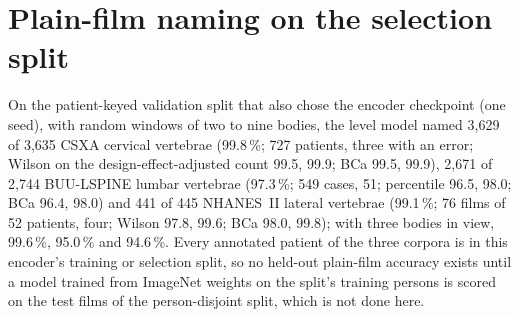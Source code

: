 \section*{Plain-film naming on the selection split}
On the patient-keyed validation split that also chose the encoder checkpoint (one seed), with random windows of two
to nine bodies, the level model named 3,629 of 3,635 CSXA cervical vertebrae (99.8\,\%; 727 patients, three with an
error; Wilson on the design-effect-adjusted count 99.5, 99.9; BCa 99.5, 99.9), 2,671 of 2,744 BUU-LSPINE lumbar
vertebrae (97.3\,\%; 549 cases, 51; percentile 96.5, 98.0; BCa 96.4, 98.0) and 441 of 445 NHANES~II lateral vertebrae
(99.1\,\%; 76 films of 52 patients, four; Wilson 97.8, 99.6; BCa 98.0, 99.8); with three bodies in view, 99.6\,\%,
95.0\,\% and 94.6\,\%. Every annotated patient of the three corpora is in this encoder's training or selection split,
so no held-out plain-film accuracy exists until a model trained from ImageNet weights on the split's training
persons is scored on the test films of the person-disjoint split, which is not done here.

